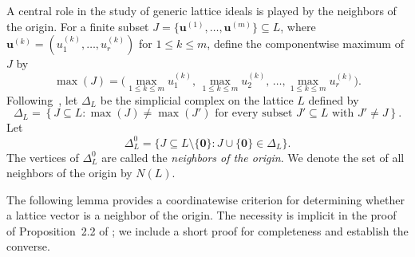 \documentclass[12pt,a4paper]{amsart}
\theoremstyle{definition}
\begin{document}
A central role in the study of generic lattice ideals is played by the
neighbors of the origin. For a finite subset
$J=\{\mathbf u^{(1)},\ldots,\mathbf u^{(m)}\}\subseteq L$,
where
$\mathbf u^{(k)}=(u^{(k)}_1,\ldots,u^{(k)}_r)$ for $1 \leq k \leq m$,
define the componentwise maximum of $J$ by
\[
\max(J)
=
\bigl(
\max_{1\le k\le m}u^{(k)}_1,\,
\max_{1\le k\le m}u^{(k)}_2,\,
\ldots,
\max_{1\le k\le m}u^{(k)}_r
\bigr).
\] Following~\cite[Section~2]{PS},
let $\Delta_L$ be the simplicial complex on the lattice $L$ defined by
\[
\Delta_L
=
\left\{
J\subseteq L:
\max(J)\neq\max(J')
\text{ for every subset }
J'\subseteq L
\text{ with }
J'\neq J
\right\}.
\]
Let
\[
\Delta_L^0
=
\{J\subseteq L\setminus\{\mathbf0\}:J\cup\{\mathbf0\}\in\Delta_L\}.
\]
The vertices of $\Delta_L^0$ are called the
\emph{neighbors of the origin}. We denote the set of all neighbors of
the origin by $N(L)$.

The following lemma provides a coordinatewise criterion for determining whether a lattice vector is a neighbor of the origin. The necessity is implicit in the proof of Proposition~2.2 of \cite{PS}; we include a short proof for completeness and establish the converse.
\end{document}
